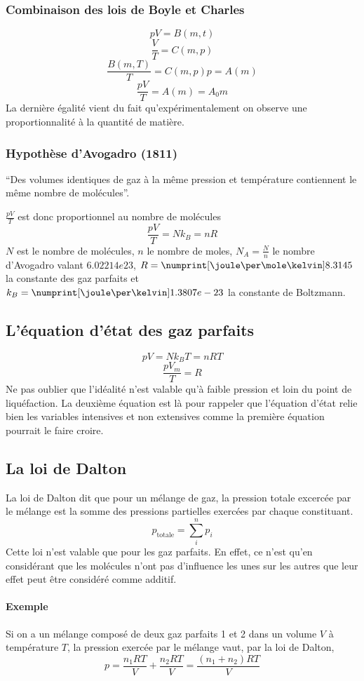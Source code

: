 \subsubsection{Combinaison des lois de Boyle et Charles}
\[ pV = B(m,t) \]
\[ \frac{V}{T} = C(m,p) \]
\[ \frac{B(m,T)}{T} = C(m,p)p = A(m) \]
\[ \frac{pV}{T} = A(m) = A_0m \]
La dernière égalité vient du fait qu'expérimentalement on observe
une proportionnalité à la quantité de matière.

\subsubsection{Hypothèse d'Avogadro (1811)}
``Des volumes identiques de gaz à la même pression et
température contiennent le même nombre de molécules''.

$\frac{pV}{T}$ est donc proportionnel au nombre de molécules
\[ \frac{pV}{T} = Nk_B = nR \]
$N$ est le nombre de molécules,
$n$ le nombre de moles,
$N_A = \frac{N}{n}$ le nombre d'Avogadro valant $\si{6.02214e23}{}$,
$R = \si{8.3145}{\joule\per\mole\kelvin}$ la constante des gaz parfaits et
$k_B = \si{1.3807e-23}{\joule\per\kelvin}$ la constante de Boltzmann.

\subsection{L'équation d'état des gaz parfaits}
\[ pV = Nk_BT = nRT \]
\[ \frac{pV_m}{T} = R \]
Ne pas oublier que l'idéalité n'est valable qu'à faible pression et
loin du point de liquéfaction.
La deuxième équation est là pour rappeler que l'équation d'état relie bien
les variables intensives et non extensives comme la première équation pourrait
le faire croire.

\subsection{La loi de Dalton}
La loi de Dalton dit que pour un mélange de gaz, la pression totale
excercée par le mélange est la somme des pressions partielles exercées
par chaque constituant.
\[ p_\mathrm{totale} = \sum_i^n p_i \]
Cette loi n'est valable que pour les gaz parfaits.
En effet, ce n'est qu'en considérant que les molécules n'ont pas d'influence
les unes sur les autres que leur effet peut être considéré comme additif.
\paragraph{Exemple}
Si on a un mélange composé de deux gaz parfaits 1 et 2
dans un volume $V$ à température $T$,
la pression exercée par le mélange vaut, par la loi de Dalton,
\[ p = \frac{n_1 R T}{V} + \frac{n_2 R T}{V} = \frac{(n_1 + n_2) R T}{V} \]

